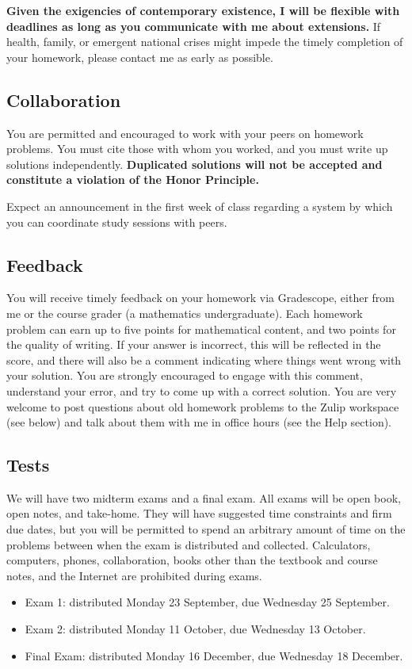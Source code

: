 \documentclass[11pt,twoside]{amsart}
\begin{document}
\textbf{Given the exigencies of contemporary existence, I will be flexible with deadlines as long as you communicate with me about extensions.} If health, family, or emergent national crises might impede the timely completion of your homework, please contact me as early as possible.

\subsection*{Collaboration}
You are permitted and encouraged to work with your peers on homework problems.  You must cite those with whom you worked, and you must write up solutions independently.  \textbf{Duplicated solutions will not be accepted and constitute a violation of the Honor Principle.}

Expect an announcement in the first week of class regarding a system by which you can coordinate study sessions with peers.

\subsection*{Feedback}
You will receive timely feedback on your homework via Gradescope, either from me or the course grader (a mathematics undergraduate).  Each homework problem can earn up to five points for mathematical content, and two points for the quality of writing.  If your answer is incorrect, this will be reflected in the score, and there will also be a comment indicating where things went wrong with your solution.  You are strongly encouraged to engage with this comment, understand your error, and try to come up with a correct solution.  You are very welcome to post questions about old homework problems to the Zulip workspace (see below) and talk about them with me in office hours (see the Help section).

\subsection*{Tests}
We will have two midterm exams and a final exam. All exams will be open book, open notes, and take-home.  They will have suggested time constraints and firm due dates, but you will be permitted to spend an arbitrary amount of time on the problems between when the exam is distributed and collected.  Calculators, computers, phones, collaboration, books other than the textbook and course notes, and the Internet are prohibited during exams. 

\begin{itemize}
\item Exam 1: distributed Monday 23 September, due Wednesday 25 September.
\item Exam 2: distributed Monday 11 October, due Wednesday 13 October.
\item Final Exam: distributed Monday 16 December, due Wednesday 18 December.
\end{itemize}
\end{document}
